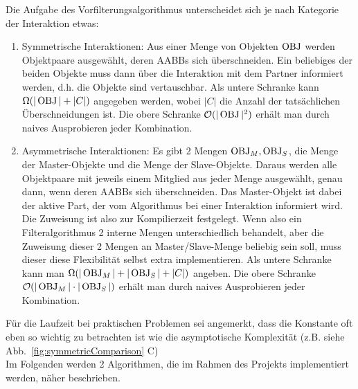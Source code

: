 Die Aufgabe des Vorfilterungsalgorithmus unterscheidet sich je nach Kategorie der Interaktion etwas:
\begin{enumerate}
\item Symmetrische Interaktionen: Aus einer Menge von Objekten $\operatorname{OBJ}$ werden Objektpaare ausgewählt, deren AABBs sich überschneiden. Ein beliebiges der beiden Objekte muss dann über die Interaktion mit dem Partner informiert werden, d.h. die Objekte sind vertauschbar.
Als untere Schranke kann $\Omega (|\operatorname{OBJ}|+|C|)$ angegeben werden, wobei $|C|$ die Anzahl der tatsächlichen Überschneidungen ist. Die obere Schranke $\mathcal{O}(|\operatorname{OBJ}|^2)$ erhält man durch naives Ausprobieren jeder Kombination.
\item Asymmetrische Interaktionen: Es gibt 2 Mengen $\operatorname{OBJ}_M, \operatorname{OBJ}_S$, die Menge der Master-Objekte und die Menge der Slave-Objekte. Daraus werden alle Objektpaare mit jeweils einem Mitglied aus jeder Menge ausgewählt, genau dann, wenn deren AABBs sich überschneiden. Das Master-Objekt ist dabei der aktive Part, der vom Algorithmus bei einer Interaktion informiert wird. Die Zuweisung ist also zur Kompilierzeit festgelegt. Wenn also ein Filteralgorithmus 2 interne Mengen unterschiedlich behandelt, aber die Zuweisung dieser 2 Mengen an Master/Slave-Menge beliebig sein soll, muss dieser diese Flexibilität selbst extra implementieren. Als untere Schranke kann man $\Omega(|\operatorname{OBJ}_M|+|\operatorname{OBJ}_S|+|C|)$ angeben. Die obere Schranke $\mathcal{O}(|\operatorname{OBJ}_M|\cdot |\operatorname{OBJ}_S|)$ erhält man durch naives Ausprobieren jeder Kombination.
\end{enumerate}

Für die Laufzeit bei praktischen Problemen sei angemerkt, dass die Konstante oft eben so wichtig zu betrachten ist wie die asymptotische Komplexität (z.B. siehe Abb.~\ref{fig:symmetricComparison} C)\\
Im Folgenden werden 2 Algorithmen, die im Rahmen des Projekts implementiert werden, näher beschrieben.



